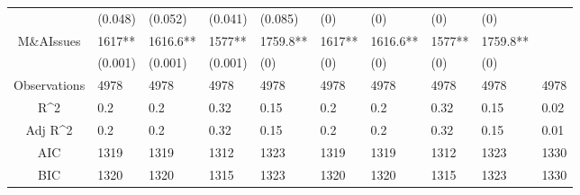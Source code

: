 \documentclass{article}
\begin{document}
\begin{table}[H]
\begin{tabular}{|clllllllll|}
   & (0.048) & (0.052) & (0.041) & (0.085) & (0) & (0) & (0) & (0) &  \\ 
  M\&AIssues & 1617** & 1616.6** & 1577** & 1759.8** & 1617** & 1616.6** & 1577** & 1759.8** &  \\ 
   & (0.001) & (0.001) & (0.001) & (0) & (0) & (0) & (0) & (0) &  \\ 
  \hline 
 Observations & 4978 & 4978 & 4978 & 4978 & 4978 & 4978 & 4978 & 4978 & 4978 \\ 
  R^2 & 0.2 & 0.2 & 0.32 & 0.15 & 0.2 & 0.2 & 0.32 & 0.15 & 0.02 \\ 
  Adj R^2 & 0.2 & 0.2 & 0.32 & 0.15 & 0.2 & 0.2 & 0.32 & 0.15 & 0.01 \\ 
  AIC & 1319 & 1319 & 1312 & 1323 & 1319 & 1319 & 1312 & 1323 & 1330 \\ 
  BIC & 1320 & 1320 & 1315 & 1323 & 1320 & 1320 & 1315 & 1323 & 1330 \\ 
   \hline
\end{tabular}
 
\end{table}
\end{document}
